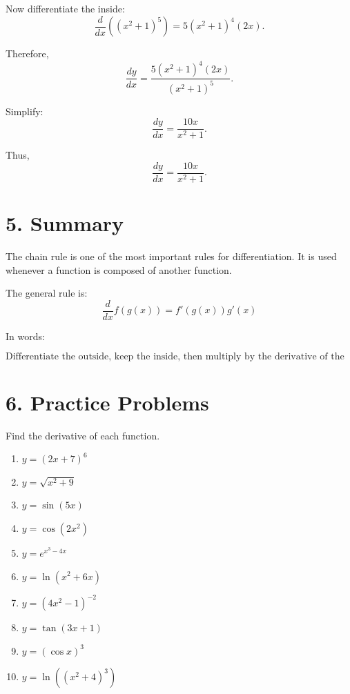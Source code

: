 \documentclass[12pt]{article}
\begin{document}
	Now differentiate the inside:
	\[
	\frac{d}{dx}\left((x^2+1)^5\right)
	=
	5(x^2+1)^4(2x).
	\]
	
	Therefore,
	\[
	\frac{dy}{dx}
	=
	\frac{5(x^2+1)^4(2x)}{(x^2+1)^5}.
	\]
	
	Simplify:
	\[
	\frac{dy}{dx}
	=
	\frac{10x}{x^2+1}.
	\]
	
	Thus,
	\[
	\boxed{\frac{dy}{dx}=\frac{10x}{x^2+1}.}
	\]
	
	\section*{5. Summary}
	
	The chain rule is one of the most important rules for differentiation. It is used whenever a function is composed of another function.
	
	The general rule is:
	\[
	\boxed{
		\frac{d}{dx}f(g(x))=f'(g(x))g'(x)
	}
	\]
	
	In words:
	
	\[
	\boxed{
		\text{Differentiate the outside, keep the inside, then multiply by the derivative of the inside.}
	}
	\]
	
	\section*{6. Practice Problems}
	
	Find the derivative of each function.
	
	\begin{enumerate}
		\item \(y=(2x+7)^6\)
		\item \(y=\sqrt{x^2+9}\)
		\item \(y=\sin(5x)\)
		\item \(y=\cos(2x^2)\)
		\item \(y=e^{x^3-4x}\)
		\item \(y=\ln(x^2+6x)\)
		\item \(y=(4x^2-1)^{-2}\)
		\item \(y=\tan(3x+1)\)
		\item \(y=(\cos x)^3\)
		\item \(y=\ln((x^2+4)^3)\)
	\end{enumerate}
	
\end{document}
